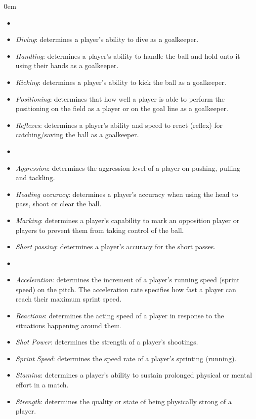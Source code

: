 \renewcommand{\labelitemi}{}
\begin{description}
    \itemsep0em
    \item[Goalkeeper:]
    \begin{itemize}
        \itemsep0.3em
        \item[]
        \item{\textit{Diving}:} determines a player's ability to dive as a goalkeeper.
        \item{\textit{Handling}:} determines a player's ability to handle the ball and hold onto it using their hands as a goalkeeper.
        \item{\textit{Kicking}:} determines a player's ability to kick the ball as a goalkeeper.
        \item{\textit{Positioning}:} determines that how well a player is able to perform the positioning on the field as a player or on the goal line as a goalkeeper.
        \item{\textit{Reflexes}:} determines a player's ability and speed to react (reflex) for catching/saving the ball as a goalkeeper.
    \end{itemize}
    \item[Mental:]
    \begin{itemize}
        \itemsep0.3em
        \item[]
        \item{\textit{Aggression}:} determines the aggression level of a player on pushing, pulling and tackling.
        \item{\textit{Heading accuracy}:} determines a player's accuracy when using the head to pass, shoot or clear the ball.
        \item{\textit{Marking}:} determines a player's capability to mark an opposition player or players to prevent them from taking control of the ball.
        \item{\textit{Short passing}:} determines a player's accuracy for the short passes.
    \end{itemize}
    \item[Physical:]
    \begin{itemize}
        \itemsep0.3em
        \item[]
        \item{\textit{Acceleration}:} determines the increment of a player's running speed (sprint speed) on the pitch. The acceleration rate specifies how fast a player can reach their maximum sprint speed.
        \item{\textit{Reactions}:} determines the acting speed of a player in response to the situations happening around them.
        \item{\textit{Shot Power}:} determines the strength of a player's shootings.
        \item{\textit{Sprint Speed}:} determines the speed rate of a player's sprinting (running).
        \item{\textit{Stamina}:} determines a player's ability to sustain prolonged physical or mental effort in a match.
        \item{\textit{Strength}:} determines the quality or state of being physically strong of a player.


\end{itemize}
\end{description}
